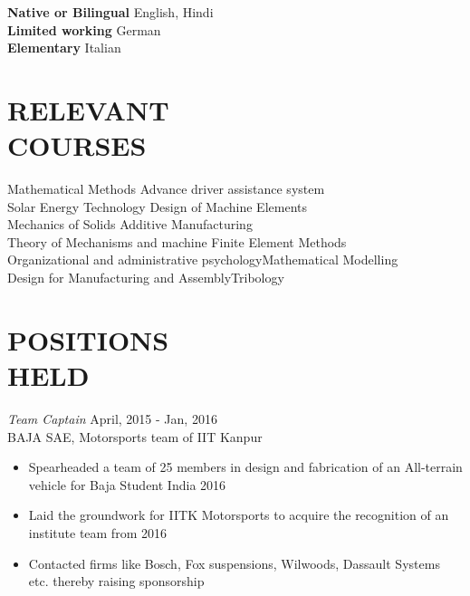 \documentclass[margin, 10pt]{res} %
\begin{document}
\begin{resume}

\textbf{Native or Bilingual} \hspace{6.0ex} English, Hindi            \\
\textbf{Limited working} \hspace{9.1ex} German          \\
\textbf{Elementary} \hspace{15.1ex} Italian           \\
\section{RELEVANT \\ COURSES}
Mathematical Methods \hfill Advance driver assistance system            \\
Solar Energy Technology \hfill Design of Machine Elements\\
Mechanics of Solids \hfill Additive Manufacturing\\
Theory of Mechanisms and machine \hfill Finite Element Methods\\
Organizational and administrative psychology\hfill Mathematical Modelling\\
Design for Manufacturing and Assembly\hfill Tribology



 






\section{ POSITIONS \\HELD}

{\sl Team Captain} \hfill April, 2015 - Jan, 2016\\
BAJA SAE, Motorsports team of IIT Kanpur\\ 
\begin{itemize} \itemsep -2pt

\item Spearheaded a team of 25 members in design and fabrication of an All-terrain vehicle for Baja Student India 2016
\item Laid the groundwork for IITK Motorsports to acquire the recognition of an institute team from  2016
\item Contacted firms like Bosch, Fox suspensions, Wilwoods, Dassault Systems etc. thereby  raising sponsorship

\end{itemize}

\clearpage

\end{resume}
\end{document}
